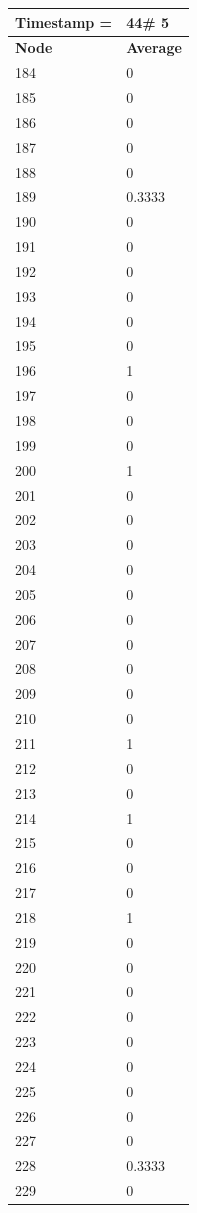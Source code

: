 \begin{tabular}{|l||l|}
\hline
\textbf{Timestamp =} & \textbf{44}\# 5\\\hline
	\textbf{Node} & \textbf{Average} \\ \hline
\hline
	184 & 0 \\ \hline
	185 & 0 \\ \hline
	186 & 0 \\ \hline
	187 & 0 \\ \hline
	188 & 0 \\ \hline
	189 & 0.3333 \\ \hline
	190 & 0 \\ \hline
	191 & 0 \\ \hline
	192 & 0 \\ \hline
	193 & 0 \\ \hline
	194 & 0 \\ \hline
	195 & 0 \\ \hline
	196 & 1 \\ \hline
	197 & 0 \\ \hline
	198 & 0 \\ \hline
	199 & 0 \\ \hline
	200 & 1 \\ \hline
	201 & 0 \\ \hline
	202 & 0 \\ \hline
	203 & 0 \\ \hline
	204 & 0 \\ \hline
	205 & 0 \\ \hline
	206 & 0 \\ \hline
	207 & 0 \\ \hline
	208 & 0 \\ \hline
	209 & 0 \\ \hline
	210 & 0 \\ \hline
	211 & 1 \\ \hline
	212 & 0 \\ \hline
	213 & 0 \\ \hline
	214 & 1 \\ \hline
	215 & 0 \\ \hline
	216 & 0 \\ \hline
	217 & 0 \\ \hline
	218 & 1 \\ \hline
	219 & 0 \\ \hline
	220 & 0 \\ \hline
	221 & 0 \\ \hline
	222 & 0 \\ \hline
	223 & 0 \\ \hline
	224 & 0 \\ \hline
	225 & 0 \\ \hline
	226 & 0 \\ \hline
	227 & 0 \\ \hline
	228 & 0.3333 \\ \hline
	229 & 0 \\ \hline
\end{tabular}
